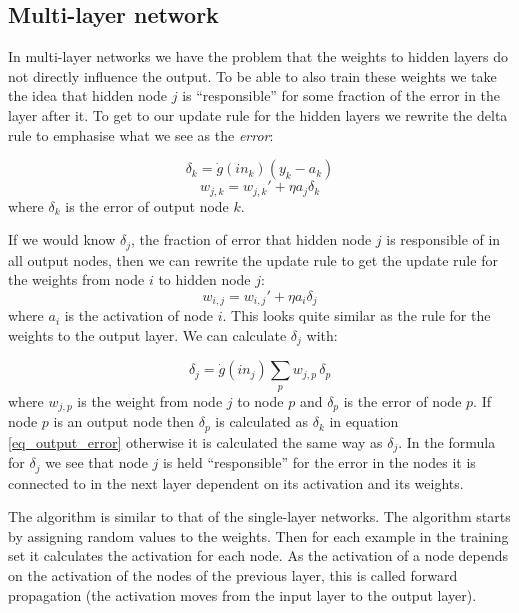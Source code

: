 \subsection{Multi-layer network}
In multi-layer networks we have the problem that the weights to hidden layers do not directly influence the output. To  be able to also train these weights we take the idea that hidden node $j$ is ``responsible'' for some fraction of the error in the layer after it. To get to our update rule for the hidden layers we rewrite the delta rule to emphasise what we see as the \emph{error}:

\begin{equation} \label{eq_output_error}
\delta_k = \dot{g}(in_k)(y_k - a_k)
\end{equation}
\begin{equation}
w_{j,k} = w_{j,k}' + \eta a_j \delta_k
\end{equation}
where $\delta_k$ is the error of output node $k$.

If we would know $\delta_j$, the fraction of error that hidden node $j$ is responsible of in all output nodes, then we can rewrite the update rule to get the update rule for the weights from node $i$ to hidden node $j$:
\begin{equation}
w_{i,j} = w_{i,j}' + \eta a_i \delta_j
\end{equation}
where $a_i$ is the activation of node $i$. This looks quite similar as the rule for the weights to the output layer. We can calculate $\delta_j$ with:

\begin{equation} \label{eq:hiddenlayerDeltaerror}
\delta_j = \dot{g}(in_j) \sum_p w_{j,p}\, \delta_p
\end{equation}
where $w_{j,p}$ is the weight from node $j$ to node $p$ and $\delta_p$ is the error of node $p$. If node $p$ is an output node then $\delta_p$ is calculated as $\delta_k$ in equation \ref{eq_output_error} otherwise it is calculated the same way as $\delta_j$. In the formula for $\delta_j$ we see that node $j$ is held ``responsible'' for the error in the nodes it is connected to in the next layer dependent on its activation and its weights.

The algorithm is similar to that of the single-layer networks. The algorithm starts by assigning random values to the weights. Then for each example in the training set it calculates the activation for each node. As the activation of a node depends on the activation of the nodes of the previous layer, this is called forward propagation (the activation moves from the input layer to the output layer). 

